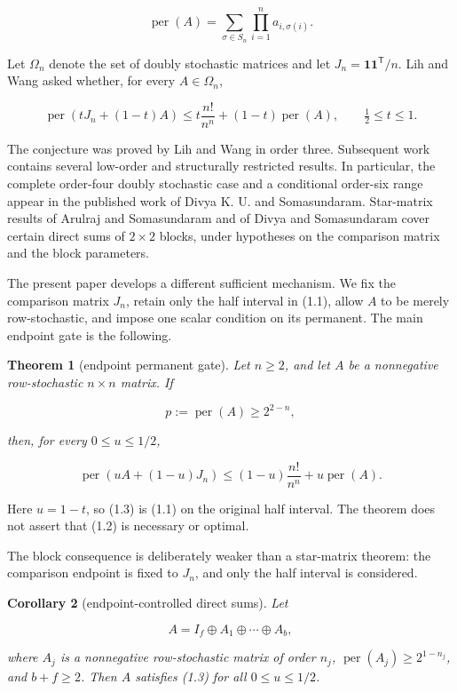 \documentclass[11pt]{article}
\newtheorem{theorem}{Theorem}[section]
\newtheorem{corollary}[theorem]{Corollary}
\begin{document}
\[
\operatorname{per}(A)=\sum_{\sigma\in S_n}\prod_{i=1}^n a_{i,\sigma(i)}.
\]

Let $\Omega_n$ denote the set of doubly stochastic matrices and let
$J_n=\mathbf1\mathbf1^{\mathsf T}/n$.  Lih and Wang asked whether, for every
$A\in\Omega_n$,

\[
\operatorname{per}(tJ_n+(1-t)A)
\le t\frac{n!}{n^n}+(1-t)\operatorname{per}(A),
\qquad \tfrac12\le t\le1. \tag{1.1}
\]

The conjecture was proved by Lih and Wang in order three.  Subsequent work contains
several low-order and structurally restricted results.  In particular, the complete
order-four doubly stochastic case and a conditional order-six range appear in the
published work of Divya K. U. and Somasundaram.  Star-matrix results of Arulraj and
Somasundaram and of Divya and Somasundaram cover certain direct sums of $2\times2$
blocks, under hypotheses on the comparison matrix and the block parameters.

The present paper develops a different sufficient mechanism.  We fix the comparison
matrix $J_n$, retain only the half interval in (1.1), allow $A$ to be merely
row-stochastic, and impose one scalar condition on its permanent.  The main endpoint
gate is the following.

\Needspace{0.18\textheight}
\begin{theorem}[endpoint permanent gate]

Let $n\ge2$, and let $A$ be a nonnegative row-stochastic $n\times n$ matrix.  If

\[
p:=\operatorname{per}(A)\ge 2^{2-n}, \tag{1.2}
\]

then, for every $0\le u\le1/2$,

\[
\operatorname{per}(uA+(1-u)J_n)
\le (1-u)\frac{n!}{n^n}+u\operatorname{per}(A). \tag{1.3}
\]

\end{theorem}

Here $u=1-t$, so (1.3) is (1.1) on the original half interval.  The theorem does
not assert that (1.2) is necessary or optimal.

The block consequence is deliberately weaker than a star-matrix theorem: the
comparison endpoint is fixed to $J_n$, and only the half interval is considered.

\Needspace{0.18\textheight}
\begin{corollary}[endpoint-controlled direct sums]

Let

\[
A=I_f\oplus A_1\oplus\cdots\oplus A_b,
\]

where $A_j$ is a nonnegative row-stochastic matrix of order $n_j$,
$\operatorname{per}(A_j)\ge2^{1-n_j}$, and $b+f\ge2$.  Then $A$
satisfies (1.3) for all $0\le u\le1/2$.

\end{corollary}
\end{document}
